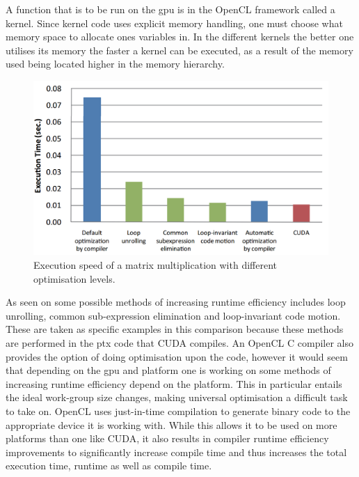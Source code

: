 A function that is to be run on the \acrshort{gpu} is in the OpenCL framework called a kernel.
Since kernel code uses explicit memory handling, one must choose what memory space to allocate ones variables in.
In the different kernels the better one utilises its memory the faster a kernel can be executed, as a result of the memory used being located higher in the memory hierarchy.
\begin{figure}[h!]
\centering
 \includegraphics[width=1\textwidth]{figures/opencloptimisation.png} %
\caption{Execution speed of a matrix multiplication with different optimisation levels. \citep{CUDAOpenCLOptimisation}}\label{image:OpenCLOptCompare}
\vspace{-15pt}
\end{figure}
As seen on  some possible methods of increasing runtime efficiency includes loop unrolling, common sub-expression elimination and loop-invariant code motion. 
These are taken as specific examples in this comparison because these methods are performed in the \acrlong{ptx} code that CUDA compiles.
An OpenCL C compiler also provides the option of doing optimisation upon the code, however it would seem that depending on the \acrshort{gpu} and platform one is working on some methods of increasing runtime efficiency depend on the platform.
This in particular entails the ideal work-group size changes, making universal optimisation a difficult task to take on.
OpenCL uses just-in-time compilation to generate binary code to the appropriate device it is working with.
While this allows it to be used on more platforms than one like CUDA, it also results in compiler runtime efficiency improvements to significantly increase compile time and thus increases the total execution time, runtime as well as compile time.\citep{CUDAOpenCLOptimisation}

